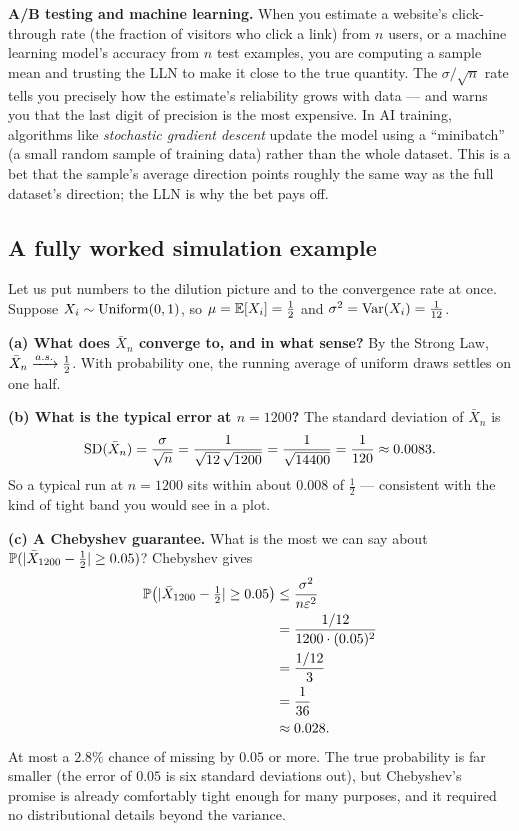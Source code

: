 \begin{applicationbox}
\textbf{A/B testing and machine learning.} When you estimate a website's click-through rate (the fraction of visitors who click a link) from $n$ users, or a machine learning model's accuracy from $n$ test examples, you are computing a sample mean and trusting the LLN to make it close to the true quantity. The $\sigma/\sqrt n$ rate tells you precisely how the estimate's reliability grows with data --- and warns you that the last digit of precision is the most expensive. In AI training, algorithms like \emph{stochastic gradient descent} update the model using a ``minibatch'' (a small random sample of training data) rather than the whole dataset. This is a bet that the sample's average direction points roughly the same way as the full dataset's direction; the LLN is why the bet pays off.
\end{applicationbox}

\subsection{A fully worked simulation example}

Let us put numbers to the dilution picture and to the convergence rate at once. Suppose $X_i \sim \operatorname{Uniform}(0,1)$, so $\mu = \operatorname{\mathbb{E}}[X_i] = \tfrac12$ and $\sigma^2 = \operatorname{Var}(X_i) = \tfrac1{12}$.

\textbf{(a) What does $\bar X_n$ converge to, and in what sense?} By the Strong Law, $\bar X_n \xrightarrow{a.s.} \tfrac12$. With probability one, the running average of uniform draws settles on one half.

\textbf{(b) What is the typical error at $n = 1200$?} The standard deviation of $\bar X_n$ is
\[
  \operatorname{SD}(\bar X_n) = \frac{\sigma}{\sqrt n} = \frac{1}{\sqrt{12}\,\sqrt{1200}} = \frac{1}{\sqrt{14400}} = \frac{1}{120} \approx 0.0083.
\]
So a typical run at $n=1200$ sits within about $0.008$ of $\tfrac12$ --- consistent with the kind of tight band you would see in a plot.

\textbf{(c) A Chebyshev guarantee.} What is the most we can say about $\operatorname{\mathbb{P}}(\lvert\bar X_{1200} - \tfrac12\rvert \ge 0.05)$? Chebyshev gives
\begin{align*}
  \operatorname{\mathbb{P}}\bigl(\lvert\bar X_{1200} - \tfrac12\rvert \ge 0.05\bigr) &\le \frac{\sigma^2}{n\varepsilon^2} \\
  &= \frac{1/12}{1200\cdot (0.05)^2} \\
  &= \frac{1/12}{3} \\
  &= \frac{1}{36} \\
  &\approx 0.028.
\end{align*}
At most a $2.8\%$ chance of missing by $0.05$ or more. The true probability is far smaller (the error of $0.05$ is six standard deviations out), but Chebyshev's promise is already comfortably tight enough for many purposes, and it required no distributional details beyond the variance.

